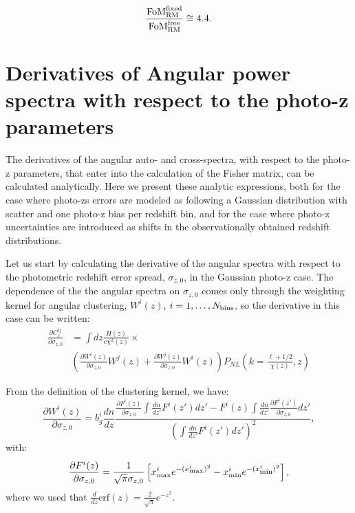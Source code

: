 \documentclass[a4paper,fleqn,usenatbib]{mnras}
\begin{document}
\begin{equation}
\frac{\mbox{FoM}_{\mbox{\scriptsize{RM}}}^{\mbox{\scriptsize{fixed}}}}{\mbox{FoM}_{\mbox{\scriptsize{RM}}}^{\mbox{\scriptsize{free}}}} \cong 4.4.
\end{equation}








\section{Derivatives of Angular power spectra with respect to the photo-z parameters}

The derivatives of the angular auto- and cross-spectra, with respect to the photo-z parameters, that enter into the calculation of the Fisher matrix, can be calculated analytically. 
Here we present these analytic expressions, both for the case where photo-zs errors are modeled as following a Gaussian distribution with scatter and one photo-z bias per redshift bin, and for the case where photo-z uncertainties are introduced as shifts in the observationally obtained redshift distributions.

Let us start by calculating the derivative of the angular spectra with respect to the photometric redshift error spread, $\sigma_{z,0}$, in the Gaussian photo-z case. The dependence of the the angular spectra on $\sigma_{z,0}$ comes only through the weighting kernel for angular clustering, $W^i(z)$, $i = 1, \dots,  N_{\mbox{\scriptsize{bins}}}$, so the derivative in this case can be written:
\begin{align}
\frac{\partial C_\ell^{ij}}{\partial \sigma_{z,0}}  &=  \int  dz \frac{H(z)}{c\chi^2(z)} \times \nonumber \\   
 & \left(\frac{\partial W^i(z)}{\partial \sigma_{z,0}} W^j(z) +
 \frac{\partial W^j(z)}{\partial \sigma_{z,0}} W^i(z)  \right)P_{NL}\left(k=\frac{\ell+1/2}{\chi(z)},z \right) 
\end{align}

From the definition of the clustering kernel, we have:
\begin{equation}
\frac{\partial W^i(z)}{\partial \sigma_{z,0}} =b_g^i \frac{dn}{dz}\frac{\frac{\partial F^i(z)}{\partial \sigma_{z,0}}\int \frac{dn}{dz'}F^i(z')dz' -F^i(z)\int \frac{dn}{dz'} \frac{\partial F^i(z')}{\partial \sigma_{z,0} }dz'}{\left(\int \frac{dn}{dz'}F^i(z')dz' \right)^2},
\end{equation}
with:
\begin{equation}
\frac{\partial  F^i(z)}{\partial \sigma_{z,0}} = \frac{1}{\sqrt{\pi}\sigma_{z,0}}\left[ x_{\mbox{\scriptsize{max}}}^i e^{- (x_{\mbox{\scriptsize{max}}}^i)^2}  -  x_{\mbox{\scriptsize{min}}}^i e^{- (x_{\mbox{\scriptsize{min}}}^i)^2} \right],
\end{equation}
where we used that $\frac{d}{dz} \mbox{erf}(z) =  \frac{2}{\sqrt{\pi}} e^{-z^2}$.
\end{document}
